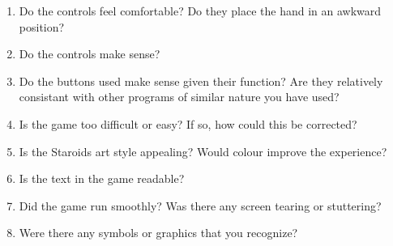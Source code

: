 \documentclass[12pt, titlepage]{article}
\begin{document}
\begin{enumerate}

  \item Do the controls feel comfortable? Do they place the hand in an awkward position?
  \item Do the controls make sense?
  \item Do the buttons used make sense given their function? Are they relatively consistant with other programs of similar nature you have used?
  \item Is the game too difficult or easy? If so, how could this be corrected?
  \item Is the Staroids art style appealing? Would colour improve the experience?
  \item Is the text in the game readable?
  \item Did the game run smoothly? Was there any screen tearing or stuttering?
  \item Were there any symbols or graphics that you recognize?

\end{enumerate}
\end{document}
